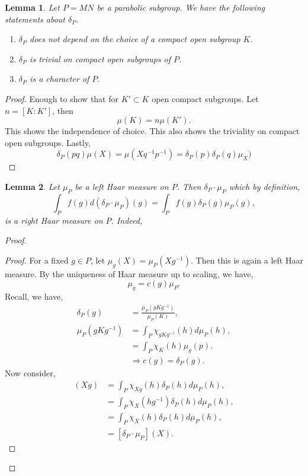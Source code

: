 \documentclass[8pt]{article}
\newtheorem{lemma}{Lemma}[section]
\begin{document}
\begin{lemma}
  \label{lemma_78}
  Let $P=MN$ be a parabolic subgroup. We have the following statements about $\delta_P$.
  \begin{enumerate}
    \item $\delta_P$ does not depend on the choice of a compact open subgroup $K$.
    \item $\delta_P$ is trivial on compact open subgroups of $P$.
    \item $\delta_P$ is a character of $P$.
  \end{enumerate}
\end{lemma}
\begin{proof}
  Enough to show that for $K'\subset K$ open compact subgroups. Let $n=[K:K']$, then 
  \begin{equation*}
    \mu(K) = n\mu(K').
  \end{equation*}
  This shows the independence of choice. This also shows the triviality on compact open subgroups. Lastly,
  \begin{equation*}
    \delta_P(pq)\mu(X) = \mu(Xq^{-1}p^{-1}) = \delta_P(p)\delta_P(q)\mu_X)
  \end{equation*}
\end{proof}
\begin{lemma}
  \label{lemma_79}
  Let $\mu_P$ be a left Haar measure on $P$. Then $\delta_P\cdot\mu_P$ which by definition,
  \begin{equation*}
    \int_Pf(g)d(\delta_P\cdot\mu_P)(g) = \int_Pf(g)\delta_P(g)\mu_P(g),
  \end{equation*}
  is a right Haar measure on $P$. Indeed,
\end{lemma}
\begin{proof}
  \begin{proof}
  For a fixed $g\in P$, let $\mu_g(X) = \mu_P(Xg^{-1})$. Then this is again a left Haar measure. By the uniqueness of Haar measure up to scaling, we have,
  \begin{equation*}
    \mu_g = c(g)\mu_P.
  \end{equation*}
  Recall, we have,
  \begin{align*}
    \delta_P(g) &= {\frac {\mu_P(gKg^{-1})} {\mu_P(K)}},\\
    \mu_P(gKg^{-1}) & = \int_{P}\chi_{gKg^{-1}}(h)d\mu_P(h),\\
    & = \int_P\chi_K(h)\mu_g(p).\\
    &\Rightarrow c(g) = \delta_P(g).
  \end{align*}
  Now consider,
  \begin{align*}
    [\delta_P\cdot\mu_P](Xg)& = \int_{P}\chi_{Xg}(h)\delta_P(h)d\mu_P(h),\\
    & = \int_{P}\chi_{X}(hg^{-1})\delta_P(h)d\mu_P(h),\\
    &=\int_{P}\chi_{X}(h)\delta_P(h)d\mu_P(h),\\
    & = [\delta_P\cdot\mu_P](X).
  \end{align*}
\end{proof}
\end{proof}
\end{document}
